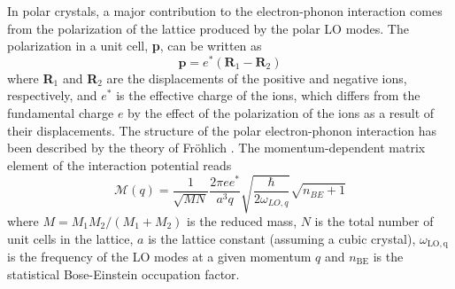 \documentclass[aps,prl,twocolumn,amsfonts,nobibnotes,superscriptaddress,showpacs]{revtex4-1}
\begin{document}
In polar crystals, a major contribution to the electron-phonon interaction comes from the polarization of the lattice produced by the polar LO modes. The polarization in a unit cell, \textbf{p}, can be written as
\begin{equation}
\textbf{p} = e^* (\textbf{R$_1$} - \textbf{R$_2$})
\end{equation}
\noindent where \textbf{R$_1$} and \textbf{R$_2$} are the displacements of the positive and negative ions, respectively, and $e^*$ is the effective charge of the ions, which differs from the fundamental charge $e$ by the effect of the polarization of the ions as a result of their displacements. The structure of the polar electron-phonon interaction has been described by the theory of Fr\"ohlich \cite{frohlich1950xx}. The momentum-dependent matrix element of the interaction potential reads
\begin{equation}
\mathscr{M}(q) = \frac{1}{\sqrt{MN}}\frac{2\pi e e^*}{a^3 q} \sqrt{\frac{\hbar}{2\omega_{LO,q}}}\sqrt{n_{BE} + 1}
\end{equation}
where $M = M_1M_2/(M_1+M_2)$ is the reduced mass, $N$ is the total number of unit cells in the lattice, $a$ is the lattice constant (assuming a cubic crystal), $\omega\mathrm{_{LO,q}}$ is the frequency of the LO modes at a given momentum $q$ and $n\mathrm{_{BE}}$ is the statistical Bose-Einstein occupation factor.
\end{document}
